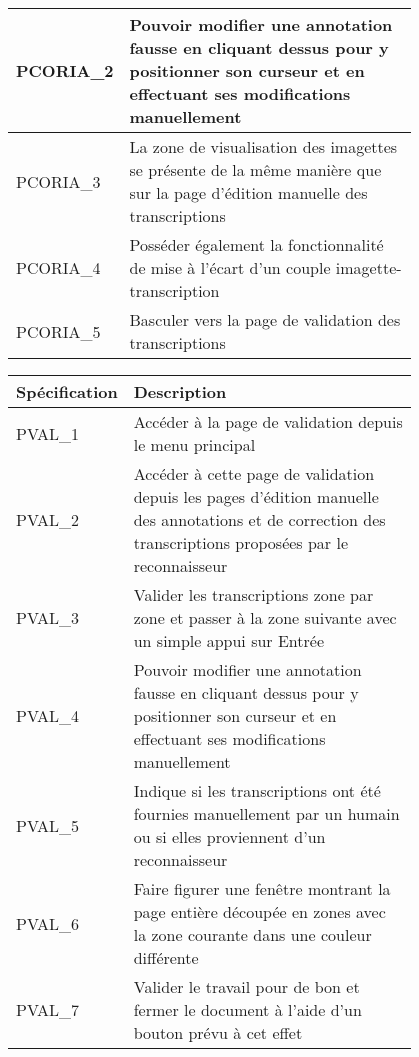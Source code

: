\begin{center}
\begin{tabular}{ | l | p{0.8\linewidth} | }
        \hline
        PCORIA\_2 & Pouvoir modifier une annotation fausse en cliquant dessus pour y positionner son curseur et en effectuant ses modifications manuellement \\
        \hline
        PCORIA\_3 & La zone de visualisation des imagettes se présente de la même manière que sur la page d’édition manuelle des transcriptions \\
        \hline
        PCORIA\_4 & Posséder également la fonctionnalité de mise à l’écart d’un couple imagette-transcription \\
        \hline
        PCORIA\_5 & Basculer vers la page de validation des transcriptions \\
        \hline
    \end{tabular}

    \begin{tabular}{ | l | p{0.8\linewidth} | }
        \hline
        \textbf{Spécification} & \textbf{Description} \\
        \hline
        PVAL\_1 & Accéder à la page de validation depuis le menu principal \\
        \hline
        PVAL\_2 & Accéder à cette page de validation depuis les pages d’édition manuelle des annotations et de correction des transcriptions proposées par le reconnaisseur \\
        \hline
        PVAL\_3 & Valider les transcriptions zone par zone et passer à la zone suivante avec un simple appui sur Entrée \\
        \hline
        PVAL\_4 & Pouvoir modifier une annotation fausse en cliquant dessus pour y positionner son curseur et en effectuant ses modifications manuellement \\
        \hline
        PVAL\_5 & Indique si les transcriptions ont été fournies manuellement par un humain ou si elles proviennent d’un reconnaisseur \\
        \hline
        PVAL\_6 & Faire figurer une fenêtre montrant la page entière découpée en zones avec la zone courante dans une couleur différente \\
        \hline
        PVAL\_7 & Valider le travail pour de bon et fermer le document à l’aide d’un bouton prévu à cet effet \\
        \hline
    \end{tabular}


\end{center}
